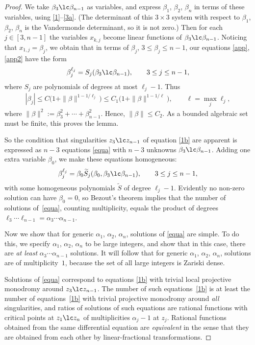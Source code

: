 \begin{proof} We take $\beta_3\lc\beta_{n-1}$ as variables, and express $\beta_1$, $\beta_2$, $\beta_n$ in terms of these variables, using \eqref{1}--\eqref{3a}. (The determinant of this $3\times3$ system with respect to $\beta_1$, $\beta_2$, $\beta_n$ is the Vandermonde determinant, so it is not zero.) Then for each $j\in[3,n-1]$ the variables $x_{k,j}$ become linear functions of $\beta_3\lc\beta_{n-1}$. Noticing that $x_{1,j}=\beta_j$, we obtain that in terms of $\beta_j$, $3\leq\beta_j\leq n-1$, our equations \eqref{app}, \eqref{app2} have the form
\begin{gather}\label{equa}
\beta_j^{\ell_j}=S_j(\beta_3\lc\beta_{n-1}),\qquad 3\leq j\leq n-1,
\end{gather}
where $S_j$ are polynomials of degrees at most $\ell_j-1$. Thus
\begin{gather*}
|\beta_j|\leq C\bigl(1+\|\beta\|^{1-1/\ell_j}\bigr)\leq C_1\bigl(1+\|\beta\|^{1-1/\ell}\bigr),\qquad \ell=\max_j\ell_j,
\end{gather*}
where $\|\beta\|^2:=\beta_3^2+\cdots+\beta_{n-1}^2$. Hence, $\|\beta\|\leq C_2 $. As a bounded algebraic set must be finite, this proves the lemma.

So the condition that singularities $z_3\lc z_{n-1}$ of equation \eqref{1b} are apparent is expressed as $n-3$ equations \eqref{equa} with $n-3$ unknowns $\beta_3\lc\beta_{n-1}$. Adding one extra variable $\beta_0$, we make these equations homogeneous:
\begin{gather*}%
\beta_j^{\ell_j}=\beta_0 \widetilde S_j(\beta_0,\beta_3\lc\beta_{n-1}),\qquad 3\leq j\leq n-1,
\end{gather*}
with some homogeneous polynomials $\widetilde S$ of degree $\ell_j-1$. Evidently no non-zero solution can have $\beta_0=0$, so Bezout's theorem \cite[Chapter~IV, Section~1]{Sh} implies that the number of solutions
of~\eqref{equa}, counting multiplicity, equals the product of degrees $\ell_3\cdots\ell_{n-1}=\alpha_3\cdots\alpha_{n-1}$.

Now we show that for generic $\alpha_1$, $\alpha_2$, $\alpha_n $, solutions of \eqref{equa} are simple. To do this, we specify $\alpha_1$, $\alpha_2$, $\alpha_n$ to be large integers, and show that in this case, there are {\em at least} $\alpha_3\cdots\alpha_{n-1}$ solutions. It will follow that for generic $\alpha_1$, $\alpha_2$, $\alpha_n $, solutions are of multiplicity~$1$, because the set of all large integers is Zariski dense.

Solutions of \eqref{equa} correspond to equations \eqref{1b} with trivial local projective monodromy around $z_3\lc z_{n-1}$. The number of such equa\-tions~\eqref{1b} is at least the number of equations~\eqref{1b} with trivial projective monodromy around {\em all} singularities, and ratios of solutions of such equations are rational functions with critical points at $z_1\lc z_n$ of multiplicities $\alpha_j-1$ at $z_j$. Rational functions obtained from the same differential equation are {\em equivalent} in the sense that they are obtained from each other by linear-fractional transformations.
\end{proof}


